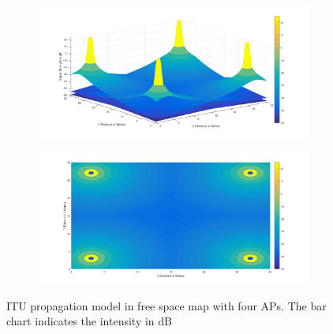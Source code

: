 \begin{figure}[!h]
\centering
	\begin{subfigure}[b]{0.75\textwidth}
		\includegraphics[width=\textwidth]{images/ITU_30x30_3d.png}
		\label{subfig:a}
		\caption{}
	\end{subfigure}
	\begin{subfigure}[b]{0.75\textwidth}
		\includegraphics[width=\textwidth]{images/ITU_30x30_tv.png}
		\label{subfig:b}
		\caption{}
	\end{subfigure}
\caption{ITU propagation model in free space map with four APs. The bar chart indicates the intensity in dB}
\end{figure}

